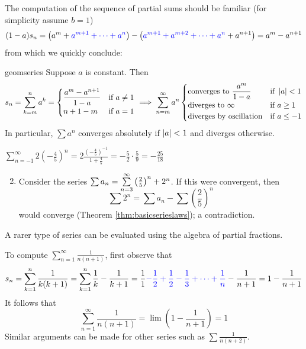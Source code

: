 The computation of the sequence of partial sums should be familiar (for simplicity assume $b=1$)
\[
	(1-a)s_n
	=\bigl(a^m+\textcolor{blue}{a^{m+1}+\cdots+a^n}\bigr)
	-\bigl(\textcolor{blue}{a^{m+1}+a^{m+2}+\cdots +a^n}+a^{n+1}\bigr) 
	=a^m-a^{n+1}
\]
from which we quickly conclude:

\begin{thm}{}{geomseries}
	Suppose $a$ is constant. Then
	\[
		s_n=\sum_{k=m}^n a^k=
		\begin{cases}
			\dfrac{a^m-a^{n+1}}{1-a}&\text{if }a\neq 1\\
			n+1-m&\text{if }a=1
		\end{cases}
		\implies \sum_{n=m}^\infty a^n
		\begin{cases}
			\text{converges to }\dfrac{a^m}{1-a}&\text{if }\left| a\right|<1\\
			\text{diverges to $\infty$}&\text{if }a\ge 1\\
			\text{diverges by oscillation}&\text{if }a\le -1
		\end{cases}
	\]
	In particular, $\sum a^n$ converges absolutely if $\left| a\right|<1$ and diverges otherwise. 
\end{thm}


\begin{examples}{}{}
	\exstart $\displaystyle \sum_{n=-1}^\infty 2\left(-\frac 45\right)^n
		=2\frac{\left(-\frac 45\right)^{-1}}{1+\frac 45} 
		=-\frac 52\cdot\frac 59
		=-\frac{25}{18}$
	\begin{enumerate}\setcounter{enumi}{1}
	  \item Consider the series $\sum a_n=\smash[b]{\sum\limits_{n=3}^\infty} \left(\frac 25\right)^n +2^n$. If this were convergent, then
		\[
			\sum 2^n=\sum a_n-\sum\left(\frac 25\right)^n
		\]
		would converge (Theorem \ref{thm:basicserieslaws}); a contradiction.
	\end{enumerate}
\end{examples}



A rarer type of series can be evaluated using the algebra of partial fractions.

\begin{example}{}{}
	To compute $\sum\limits_{n=1}^\infty\frac 1{n(n+1)}$, first  observe that
	\[
		s_n=\sum_{k=1}^n\frac 1{k(k+1)} 
		=\sum_{k=1}^n\frac 1k-\frac 1{k+1} 
		=\frac 11\textcolor{blue}{-\frac 12+\frac 12-\frac 13+\cdots+\frac 1n}-\frac 1{n+1}
		=1-\frac 1{n+1}
	\]
	It follows that
	\[
		\sum_{n=1}^\infty\frac 1{n(n+1)}
		=\lim \left(1-\frac 1{n+1}\right)=1
	\]
	Similar arguments can be made for other series such as $\sum\frac 1{n(n+2)}$.
\end{example}


